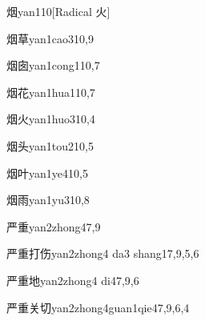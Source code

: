 \begin{entry}{烟}{yan1}{10}[Radical 火]
\end{entry}

\begin{entry}{烟草}{yan1cao3}{10,9}
\end{entry}

\begin{entry}{烟囱}{yan1cong1}{10,7}
\end{entry}

\begin{entry}{烟花}{yan1hua1}{10,7}
\end{entry}

\begin{entry}{烟火}{yan1huo3}{10,4}
\end{entry}

\begin{entry}{烟头}{yan1tou2}{10,5}
\end{entry}

\begin{entry}{烟叶}{yan1ye4}{10,5}
\end{entry}

\begin{entry}{烟雨}{yan1yu3}{10,8}
\end{entry}

\begin{entry}{严重}{yan2zhong4}{7,9}
\end{entry}

\begin{entry}{严重打伤}{yan2zhong4 da3 shang1}{7,9,5,6}
\end{entry}

\begin{entry}{严重地}{yan2zhong4 di4}{7,9,6}
\end{entry}

\begin{entry}{严重关切}{yan2zhong4guan1qie4}{7,9,6,4}
\end{entry}

